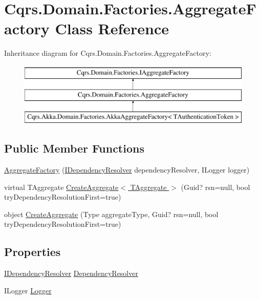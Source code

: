 \hypertarget{classCqrs_1_1Domain_1_1Factories_1_1AggregateFactory}{}\section{Cqrs.\+Domain.\+Factories.\+Aggregate\+Factory Class Reference}
\label{classCqrs_1_1Domain_1_1Factories_1_1AggregateFactory}
Inheritance diagram for Cqrs.\+Domain.\+Factories.\+Aggregate\+Factory\+:\begin{figure}[H]
\begin{center}
\leavevmode
\includegraphics[height=3.000000cm]{classCqrs_1_1Domain_1_1Factories_1_1AggregateFactory}
\end{center}
\end{figure}
\subsection*{Public Member Functions}
\begin{DoxyCompactItemize}
\item 
\hyperlink{classCqrs_1_1Domain_1_1Factories_1_1AggregateFactory_a8731bed6c8a8594c17bf0d32ff83939a}{Aggregate\+Factory} (\hyperlink{interfaceCqrs_1_1Configuration_1_1IDependencyResolver}{I\+Dependency\+Resolver} dependency\+Resolver, I\+Logger logger)
\item 
virtual T\+Aggregate \hyperlink{classCqrs_1_1Domain_1_1Factories_1_1AggregateFactory_aa13b39399abe7db18005573c28ab3d2a}{Create\+Aggregate$<$ T\+Aggregate $>$} (Guid? rsn=null, bool try\+Dependency\+Resolution\+First=true)
\item 
object \hyperlink{classCqrs_1_1Domain_1_1Factories_1_1AggregateFactory_aa60839e14ef01b3971067e1f154ee6b4}{Create\+Aggregate} (Type aggregate\+Type, Guid? rsn=null, bool try\+Dependency\+Resolution\+First=true)
\end{DoxyCompactItemize}
\subsection*{Properties}
\begin{DoxyCompactItemize}
\item 
\hyperlink{interfaceCqrs_1_1Configuration_1_1IDependencyResolver}{I\+Dependency\+Resolver} \hyperlink{classCqrs_1_1Domain_1_1Factories_1_1AggregateFactory_acae0733e4069776322e0c4cb5d335c09}{Dependency\+Resolver}
\item 
I\+Logger \hyperlink{classCqrs_1_1Domain_1_1Factories_1_1AggregateFactory_a78a24b5139cda7a07f938169a406f66e}{Logger}
\end{DoxyCompactItemize}


